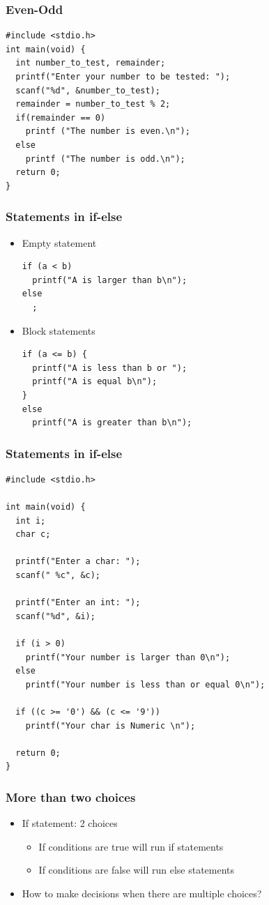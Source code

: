 \documentclass{../c-lecture}
\begin{document}
\begin{frame}[fragile]
  \frametitle{Even-Odd}
  \begin{verbatim}
#include <stdio.h>
int main(void) {
  int number_to_test, remainder;
  printf("Enter your number to be tested: ");
  scanf("%d", &number_to_test);
  remainder = number_to_test % 2;
  if(remainder == 0)
    printf ("The number is even.\n");
  else
    printf ("The number is odd.\n");
  return 0;
}
  \end{verbatim}
\end{frame}

\begin{frame}[fragile]
  \frametitle{Statements in if-else}
  \begin{itemize}
    \item Empty statement
    \begin{verbatim}
if (a < b)
  printf("A is larger than b\n");
else
  ;
    \end{verbatim}
    \item Block statements
    \begin{verbatim}
if (a <= b) {
  printf("A is less than b or ");
  printf("A is equal b\n");
}
else
  printf("A is greater than b\n");
    \end{verbatim}
  \end{itemize}
\end{frame}

\begin{frame}[fragile]
  \frametitle{Statements in if-else}
  \scriptsize
  \begin{verbatim}
#include <stdio.h>

int main(void) {
  int i;
  char c;

  printf("Enter a char: ");
  scanf(" %c", &c);

  printf("Enter an int: ");
  scanf("%d", &i);

  if (i > 0)
    printf("Your number is larger than 0\n");
  else
    printf("Your number is less than or equal 0\n");

  if ((c >= '0') && (c <= '9'))
    printf("Your char is Numeric \n");

  return 0;
}
  \end{verbatim}
\end{frame}

\begin{frame}
  \frametitle{More than two choices}
  \begin{itemize}
    \item If statement: 2 choices
    \begin{itemize}
      \item If conditions are true will run if statements
      \item If conditions are false will run else statements
    \end{itemize}
    \item How to make decisions when there are multiple choices?
  \end{itemize}
\end{frame}
\end{document}
